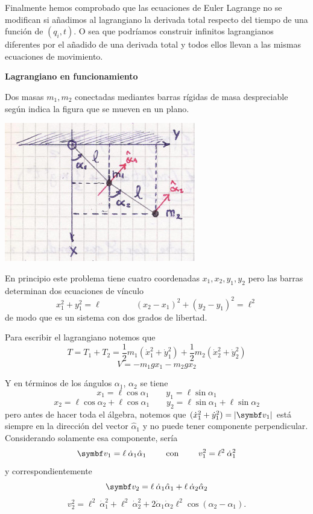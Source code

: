 \documentclass[10pt,oneside]{CBFT_book}
\begin{document}
Finalmente hemos comprobado que las ecuaciones de Euler Lagrange no se modifican si añadimos al lagrangiano la 
derivada total respecto del tiempo de una función de $(q_i,t)$.
O sea que podríamos construir infinitos lagrangianos diferentes por el añadido de una derivada total y todos
ellos llevan a las mismas ecuaciones de movimiento.

\begin{ejemplo}{\bf Lagrangiano en funcionamiento}

Dos masas $m_1, m_2$ conectadas mediantes barras rígidas de masa despreciable según indica la figura que se mueven en 
un plano.

\includegraphics[scale=0.35]{images/fig_mc_clasica_pendulo_doble.jpg}

En principio este problema tiene cuatro coordenadas $x_1,x_2,y_1,y_2$ pero las barras determinan dos ecuaciones de 
vínculo
\[
	x_1^2 + y_1^2 = \ell  \qquad \qquad (x_2-x_1)^2 + (y_2-y_1)^2 = \ell^2
\]
de modo que es un sistema con dos grados de libertad.


Para escribir el lagrangiano notemos que 
\[
	T = T_1 + T_2 = \frac 1 2 m_1 ( \dot{x}_1^2 + \dot{y}_1^2 ) + \frac 1 2 m_2 ( \dot{x}_2^2 + \dot{y}_2^2 ) 
\]
\[
	V = -m_1 g x_1 - m_2 g x_2
\]

Y en términos de los ángulos $\alpha_1$, $\alpha_2$ se tiene 
\[
	x_1 = \ell \cos \alpha_1 \qquad y_1 = \ell \sin \alpha_1 
\]
\[
	x_2 = \ell \cos \alpha_2 + \ell \cos \alpha_1 \qquad y_2 = \ell \sin \alpha_1 + \ell \sin \alpha_2
\]
pero antes de hacer toda el álgebra, notemos que $( \dot{x}_1^2 + \dot{y}_1^2 ) = |\vb{v}_1| $ está siempre en la 
dirección del vector $\hat{\alpha}_1$ y no puede tener componente perpendicular. Considerando solamente esa componente, 
sería
\[
	\vb{v}_1 = \ell \: \dot{\alpha}_1 \hat{\alpha}_1 \qquad \text{ con } \qquad v_1^2 = \ell^2 \: \dot{\alpha}_1^2
\]
y correspondientemente
\[
	\vb{v}_2 = \ell \: \dot{\alpha}_1 \hat{\alpha}_1 + \ell \: \dot{\alpha}_2 \hat{\alpha}_2
\]
\[
	v_2^2 = \ell^2 \: \dot{\alpha}_1^2 + \ell^2 \: \dot{\alpha}_2^2 + 2 \dot{\alpha}_1 \dot{\alpha}_2 \ell^2
	\cos ( \alpha_2 - \alpha_1 ).
\]
\end{ejemplo}
\end{document}

